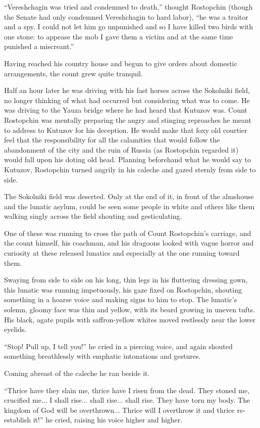 ``Vereshchagin was tried and condemned to death,'' thought
Rostopchin (though the Senate had only condemned Vereshchagin to
hard labor), ``he was a traitor and a spy. I could not let him go
unpunished and so I have killed two birds with one stone: to
appease the mob I gave them a victim and at the same time
punished a miscreant.''

Having reached his country house and begun to give orders about
domestic arrangements, the count grew quite tranquil.

Half an hour later he was driving with his fast horses across the
Sokolniki field, no longer thinking of what had occurred but
considering what was to come. He was driving to the Yauza bridge
where he had heard that Kutuzov was. Count Rostopchin was
mentally preparing the angry and stinging reproaches he meant to
address to Kutuzov for his deception. He would make that foxy old
courtier feel that the responsibility for all the calamities that
would follow the abandonment of the city and the ruin of Russia
(as Rostopchin regarded it) would fall upon his doting old
head. Planning beforehand what he would say to Kutuzov,
Rostopchin turned angrily in his caleche and gazed sternly from
side to side.

The Sokolniki field was deserted. Only at the end of it, in front
of the almshouse and the lunatic asylum, could be seen some
people in white and others like them walking singly across the
field shouting and gesticulating.

One of these was running to cross the path of Count Rostopchin's
carriage, and the count himself, his coachman, and his dragoons
looked with vague horror and curiosity at these released lunatics
and especially at the one running toward them.

Swaying from side to side on his long, thin legs in his
fluttering dressing gown, this lunatic was running impetuously,
his gaze fixed on Rostopchin, shouting something in a hoarse
voice and making signs to him to stop. The lunatic's solemn,
gloomy face was thin and yellow, with its beard growing in uneven
tufts. His black, agate pupils with saffron-yellow whites moved
restlessly near the lower eyelids.

``Stop! Pull up, I tell you!'' he cried in a piercing voice, and
again shouted something breathlessly with emphatic intonations
and gestures.

Coming abreast of the caleche he ran beside it.

``Thrice have they slain me, thrice have I risen from the
dead. They stoned me, crucified me... I shall rise... shall
rise... shall rise.  They have torn my body. The kingdom of God
will be overthrown... Thrice will I overthrow it and thrice
re-establish it!'' he cried, raising his voice higher and higher.

